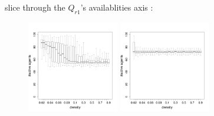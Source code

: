 \documentclass[8pt, handout=show,notes=show]{beamer}
\begin{document}
\renewcommand{\imgSize}{4cm}\addtocounter{framenumber}{-1}

\begin{frame}{slice through the $Q_{r1}$'s availablities axis : }
\begin{figure}[H]
\includegraphics[width=\imgSize]{images/alive_density_r1-50.png}
\includegraphics[width=\imgSize]{images/alive_density_r1-70.png}\\

\end{figure}
\end{frame}
\end{document}
